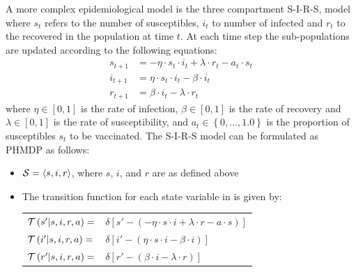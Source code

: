 A more complex epidemiological model is the three compartment S-I-R-S, model where {\footnotesize $ s_t $} refers to the number of susceptibles, {\footnotesize $ i_t $} to number of infected and {\footnotesize $ r_t $} to the recovered in the population at time {\footnotesize $ t $}. At each time step the sub-populations are updated according to the following equations:
{\footnotesize
\begin{align*}
    s_{t + 1} &= -\eta \cdot s_t \cdot i_t + \lambda \cdot r_t - a_t \cdot s_t \\
    i_{t + 1} &= \eta \cdot s_t \cdot i_t - \beta \cdot i_t \\
    r_{t+1} &= \beta \cdot i_t - \lambda \cdot r_t 
\end{align*}
}
where {\footnotesize $ \eta \in [0, 1]$} is the rate of infection, {\footnotesize $ \beta \in [0, 1]$} is the rate of recovery and {\footnotesize $ \lambda \in [0, 1]$} is the rate of susceptibility, and {\footnotesize $ a_t \in \left\lbrace 0, \ldots, 1.0\right\rbrace $} is the proportion of susceptibles {\footnotesize $ s_t $} to be vaccinated. The S-I-R-S model can be formulated as PHMDP as follows:
\begin{itemize}
    \item {\footnotesize $ \mathcal{S} = \left\langle s, i, r \right\rangle$}, where $ s $, $ i $, and $ r $ are as defined above
    \item The transition function {\footnotesize \Transition} for each state variable in {\footnotesize \State} is given by:    \\
    {\footnotesize 
        \abovedisplayskip=5pt
        \belowdisplayskip=0pt
        \renewcommand{\arraystretch}{1.5}
        \begin{tabular}{ll}
            $ \mathcal{T}\left( s' | s, i, r, a \right) =$ & $ \delta \left[ s' - (- \eta \cdot s \cdot i + \lambda \cdot r -a \cdot s) \right] $ \\
            $ \mathcal{T}\left( i' | s, i, r, a \right) =$ & $ \delta \left[ i' - (\eta \cdot s \cdot i - \beta \cdot i) \right] $ \\
            $ \mathcal{T}\left( r' | s, i, r, a \right) =$ & $ \delta \left[ r' - (\beta \cdot i - \lambda \cdot r) \right] $ \\            
        \end{tabular}
    }%
\end{itemize} 

